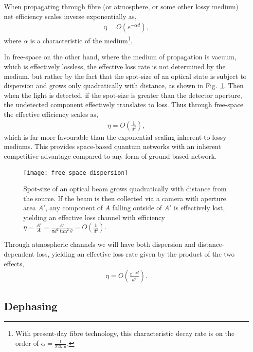 When propagating through fibre (or atmosphere, or some other lossy medium) net efficiency scales inverse exponentially as,
\begin{align}
	\eta = O(e^{-\alpha d}),
\end{align}
where $\alpha$ is a characteristic of the medium\footnote{With present-day fibre technology, this characteristic decay rate is on the order of \mbox{$\alpha = \frac{1}{22\mathrm{km}}$}.}.

In free-space on the other hand, where the medium of propagation is vacuum, which is effectively lossless, the effective loss rate is not determined by the medium, but rather by the fact that the spot-size of an optical state is subject to dispersion and grows only quadratically with distance, as shown in Fig.~\ref{fig:free_space_disp}. Then when the light is detected, if the spot-size is greater than the detector aperture, the undetected component effectively translates to loss. Thus through free-space the effective efficiency scales as,
\begin{align}
	\eta = O\left(\frac{1}{d^2}\right),
\end{align}
which is far more favourable than the exponential scaling inherent to lossy mediums. This provides space-based quantum networks with an inherent competitive advantage compared to any form of ground-based network.

\begin{figure}[!htbp]
	\texttt{[image: free\_space\_dispersion]}
	\captionspacefig \caption{Spot-size of an optical beam grows quadratically with distance from the source. If the beam is then collected via a camera with aperture area $A'$, any component of $A$ falling outside of $A'$ is effectively lost, yielding an effective loss channel with efficiency \mbox{$\eta = \frac{A'}{A} = \frac{A'}{\pi d^2 \tan^2\theta} = O\left(\frac{1}{d^2}\right)$}.} \label{fig:free_space_disp}
\end{figure}

Through atmospheric channels we will have both dispersion and distance-dependent loss, yielding an effective loss rate given by the product of the two effects,
\begin{align}
	\eta = O\left(\frac{e^{-\alpha d}}{d^2}\right).
\end{align}

%
%

\subsection{Dephasing} \label{sec:dephasing_error} 

